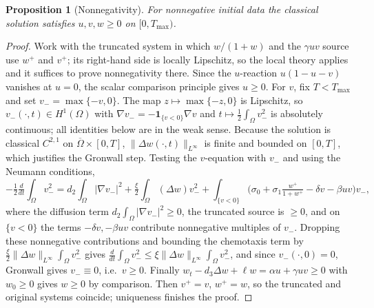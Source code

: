 \documentclass[10pt,a4paper]{amsart}
\newtheorem{proposition}[theorem]{Proposition}
\newcommand{\Om}{\Omega}
\begin{document}
\begin{proposition}[Nonnegativity]\label{app:prop:positivity}
For nonnegative initial data the classical solution satisfies $u,v,w\ge0$ on
$[0,T_{\max})$.
\end{proposition}

\begin{proof}
Work with the truncated system in which $w/(1+w)$ and the $\gamma uv$ source use
$w^+$ and $v^+$; its right-hand side is locally Lipschitz, so the local theory
applies and it suffices to prove nonnegativity there. Since the $u$-reaction
$u(1-u-v)$ vanishes at $u=0$, the scalar comparison principle gives $u\ge0$. For
$v$, fix $T<T_{\max}$ and set $v_-=\max\{-v,0\}$. The map $z\mapsto\max\{-z,0\}$
is Lipschitz, so $v_-(\cdot,t)\in H^1(\Om)$ with
$\nabla v_-=-\mathbf 1_{\{v<0\}}\nabla v$ and
$t\mapsto\frac12\int_\Om v_-^2$ is absolutely continuous; all identities below
are in the weak sense. Because the solution is classical
$C^{2,1}$ on $\overline\Om\times[0,T]$, $\|\Delta w(\cdot,t)\|_{L^\infty}$ is
finite and bounded on $[0,T]$, which justifies the Gronwall step. Testing the
$v$-equation with $v_-$ and using the Neumann conditions,
\[
-\tfrac12\tfrac{d}{dt}\!\int_\Om v_-^2
= d_2\!\int_\Om|\nabla v_-|^2 +\tfrac{\xi}{2}\!\int_\Om(\Delta w)v_-^2
+\int_{\{v<0\}}\!\Big(\sigma_0+\sigma_1\tfrac{w^+}{1+w^+}-\delta v-\beta uv\Big)v_-,
\]
where the diffusion term $d_2\!\int_\Om|\nabla v_-|^2\ge0$, the truncated source
is $\ge0$, and on $\{v<0\}$ the terms $-\delta v,-\beta uv$ contribute
nonnegative multiples of $v_-$. Dropping these nonnegative contributions and
bounding the chemotaxis term by
$\tfrac{\xi}{2}\|\Delta w\|_{L^\infty}\!\int_\Om v_-^2$ gives
$\frac{d}{dt}\int_\Om v_-^2\le\xi\|\Delta w\|_{L^\infty}\int_\Om v_-^2$, and
since $v_-(\cdot,0)=0$, Gronwall gives $v_-\equiv0$, i.e.\ $v\ge0$. Finally
$w_t-d_3\Delta w+\ell w=\alpha u+\gamma uv\ge0$ with $w_0\ge0$ gives $w\ge0$ by
comparison. Then $v^+=v$, $w^+=w$, so the truncated and original systems
coincide; uniqueness finishes the proof.
\end{proof}
\end{document}
